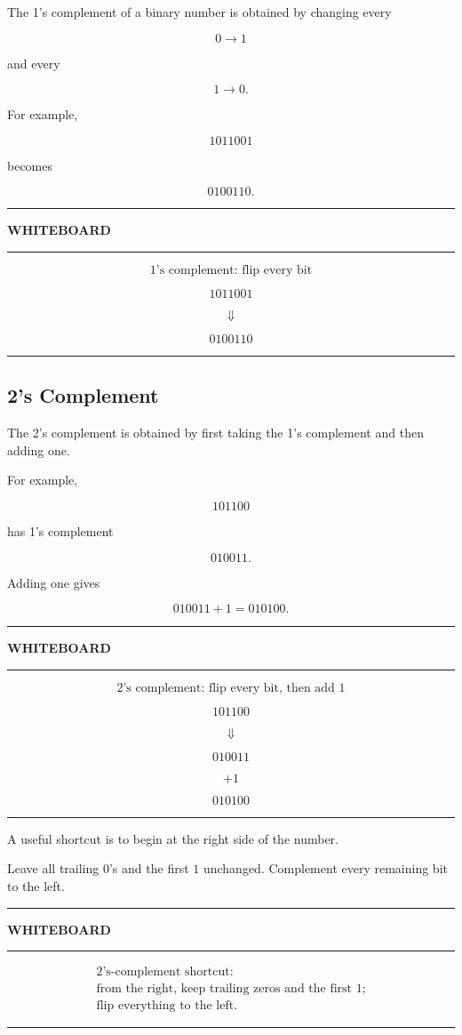 \documentclass[11pt]{article}
\newenvironment{whiteboard}
{
    \par\medskip
    \begin{center}
    \begin{minipage}{0.94\textwidth}
    \hrule
    \vspace{0.4em}
    \textbf{\large WHITEBOARD}
    \vspace{0.3em}
    \hrule
    \vspace{0.7em}
}
{
    \vspace{0.5em}
    \hrule
    \end{minipage}
    \end{center}
    \medskip
}
\begin{document}
The 1's complement of a binary number is obtained by changing every

\[
0\rightarrow1
\]

and every

\[
1\rightarrow0.
\]

For example,

\[
1011001
\]

becomes

\[
0100110.
\]

\begin{whiteboard}
\[
\boxed{\text{1's complement: flip every bit}}
\]

\[
1011001
\]

\[
\Downarrow
\]

\[
0100110
\]
\end{whiteboard}

\subsection{2's Complement}

The 2's complement is obtained by first taking the 1's complement and then
adding one.

For example,

\[
101100
\]

has 1's complement

\[
010011.
\]

Adding one gives

\[
010011+1=010100.
\]

\begin{whiteboard}
\[
\boxed{\text{2's complement: flip every bit, then add 1}}
\]

\[
101100
\]

\[
\Downarrow
\]

\[
010011
\]

\[
+1
\]

\[
\boxed{010100}
\]
\end{whiteboard}

A useful shortcut is to begin at the right side of the number.

Leave all trailing \(0\)'s and the first \(1\) unchanged. Complement every
remaining bit to the left.

\begin{whiteboard}
\[
\boxed{
\begin{array}{c}
\text{2's-complement shortcut:}\\
\text{from the right, keep trailing zeros and the first 1;}\\
\text{flip everything to the left.}
\end{array}}
\]
\end{whiteboard}
\end{document}
